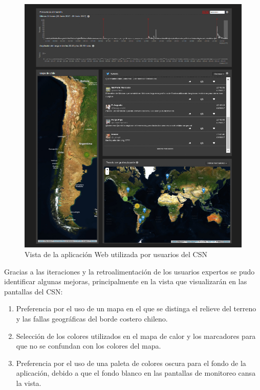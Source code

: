 	\begin{figure}[ht]
	  \centering
	  \includegraphics[trim={0 0 0 0}, clip, width=\textwidth]{imagenes/aplicacionexplorar_csn.png}
	  \caption{Vista de la aplicación Web utilizada por usuarios del CSN}
	\label{fig:webapp_csn}
	\end{figure}


Gracias a las iteraciones y la retroalimentación de los usuarios expertos se pudo identificar algunas mejoras, principalmente en la vista que visualizarán en las pantallas del CSN:

\begin{enumerate}
\item Preferencia por el uso de un mapa en el que se distinga el relieve del terreno y las fallas geográficas del borde costero chileno.
\item Selección de los colores utilizados en el mapa de calor y los marcadores para que no se confundan con los colores del mapa. 
\item Preferencia por el uso de una paleta de colores oscura para el fondo de la aplicación, debido a que el fondo blanco en las pantallas de monitoreo cansa la vista.
\end{enumerate}


